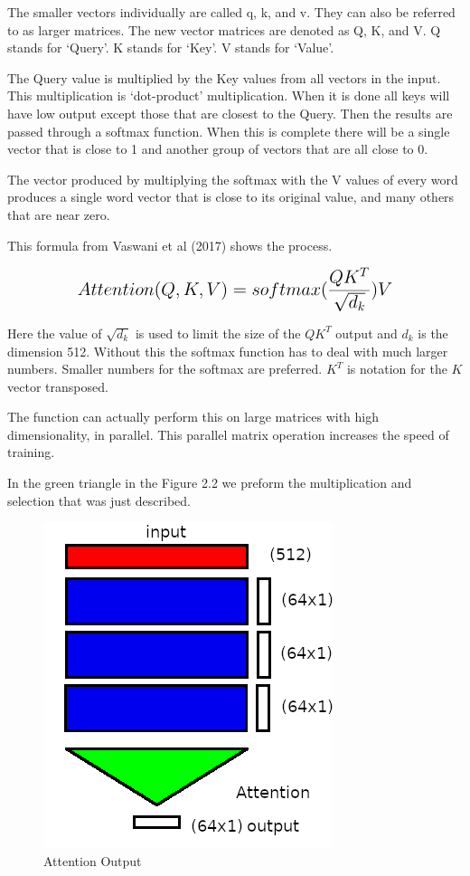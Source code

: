 The smaller vectors individually are called q, k, and v. They can also be referred to as larger matrices. The new vector matrices are denoted as Q, K, and V. Q stands for `Query'. K stands for `Key'. V stands for `Value'. 

The Query value is multiplied by the Key values from all vectors in the input. This multiplication is `dot-product' multiplication. When it is done all keys will have low output except those that are closest to the Query. Then the results are passed through a softmax function. When this is complete there will be a single vector that is close to 1 and another group of vectors that are all close to 0.

The vector produced by multiplying the softmax with the V values of every word produces a single word vector that is close to its original value, and many others that are near zero.

This formula from Vaswani et al (2017)\cite{Vaswani2017AttentionIA} 
shows the process.

$$
\mathlarger{ \mathlarger{
Attention(Q,K,V)=softmax(\dfrac{QK^T}{\sqrt{d_k}})V
} }
$$

Here the value of $\sqrt{d_k}$ is used to limit the size of the $QK^T$ output and $d_k$ is the dimension 512. Without this the softmax function has to deal with much larger numbers. Smaller numbers for the softmax are preferred. $K^T$ is notation for the $K$ vector transposed.

The function can actually perform this on large matrices with high dimensionality, in parallel. This parallel matrix operation increases the speed of training.

In the green triangle in the Figure 2.2 we preform the multiplication and selection that was just described.

\begin{figure}[H]
	\begin{center}
		
		
		\includegraphics[scale=0.5]{diagram-mat03-64}
	\end{center}
	\caption[Attention Output]{Attention Output}
	

\end{figure}




